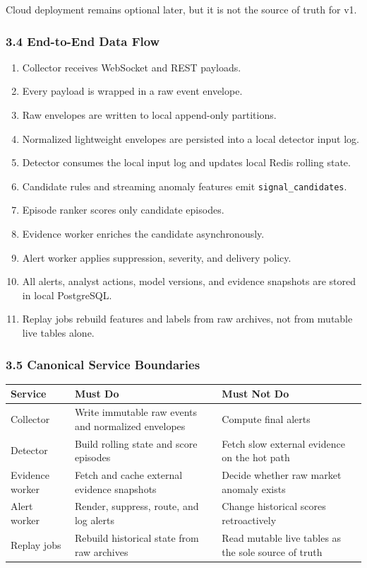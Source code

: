 \documentclass[
]{article}
\newcounter{none} %
\providecommand{\tightlist}{%
  \setlength{\itemsep}{0pt}\setlength{\parskip}{0pt}}
\begin{document}
Cloud deployment remains optional later, but it is not the source of
truth for v1.

\subsubsection{3.4 End-to-End Data Flow}\label{34-end-to-end-data-flow}

\begin{enumerate}
\def\labelenumi{\arabic{enumi}.}
\tightlist
\item
  Collector receives WebSocket and REST payloads.
\item
  Every payload is wrapped in a raw event envelope.
\item
  Raw envelopes are written to local append-only partitions.
\item
  Normalized lightweight envelopes are persisted into a local detector
  input log.
\item
  Detector consumes the local input log and updates local Redis rolling
  state.
\item
  Candidate rules and streaming anomaly features emit
  \texttt{signal\_candidates}.
\item
  Episode ranker scores only candidate episodes.
\item
  Evidence worker enriches the candidate asynchronously.
\item
  Alert worker applies suppression, severity, and delivery policy.
\item
  All alerts, analyst actions, model versions, and evidence snapshots
  are stored in local PostgreSQL.
\item
  Replay jobs rebuild features and labels from raw archives, not from
  mutable live tables alone.
\end{enumerate}

\subsubsection{3.5 Canonical Service
Boundaries}\label{35-canonical-service-boundaries}

{\def\LTcaptype{none} %
\begin{longtable}[]{@{}lll@{}}
\toprule\noalign{}
Service & Must Do & Must Not Do \\
\midrule\noalign{}
\endhead
\bottomrule\noalign{}
\endlastfoot
Collector & Write immutable raw events and normalized envelopes &
Compute final alerts \\
Detector & Build rolling state and score episodes & Fetch slow external
evidence on the hot path \\
Evidence worker & Fetch and cache external evidence snapshots & Decide
whether raw market anomaly exists \\
Alert worker & Render, suppress, route, and log alerts & Change
historical scores retroactively \\
Replay jobs & Rebuild historical state from raw archives & Read mutable
live tables as the sole source of truth \\
\end{longtable}
}
\end{document}
